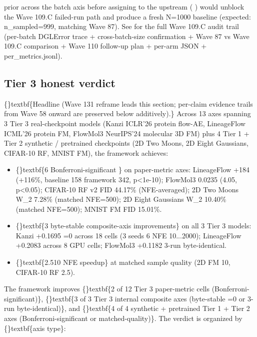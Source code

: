 \documentclass{article}
\begin{document}
prior across the batch axis before assigning to the upstream (  )  would unblock the Wave 109.C failed-run path and produce a fresh N=1000 baseline (expected: n\_sampled=999, matching Wave 87). See  for the full Wave 109.C audit trail (per-batch DGLError trace + cross-batch-size confirmation + Wave 87 vs Wave 109.C comparison + Wave 110 follow-up plan + per-arm JSON + per\_metrics.jsonl).

\subsection{Tier 3 honest verdict}
\{\}textbf\{Headline (Wave 131 reframe  leads this section; per-claim evidence trails from Wave 58 onward are preserved below additively).\} Across 13 axes spanning 3 Tier 3 real-checkpoint models (Kanzi ICLR'26 protein flow-AE, LineageFlow ICML'26 protein FM, FlowMol3 NeurIPS'24 molecular 3D FM) plus 4 Tier 1 + Tier 2 synthetic / pretrained checkpoints (2D Two Moons, 2D Eight Gaussians, CIFAR-10 RF, MNIST FM), the framework achieves:

\begin{itemize}
\item \{\}textbf\{6 Bonferroni-significant \} on paper-metric axes: LineageFlow  +184 (+116\%, baseline 158  framework 342, p<1e-10); FlowMol3  0.0235 (4.05, p<0.05); CIFAR-10 RF v2 FID 44.17\% (NFE-averaged); 2D Two Moons W\_2 7.28\% (matched NFE=500); 2D Eight Gaussians W\_2 10.40\% (matched NFE=500); MNIST FM FID 15.01\%.
\item \{\}textbf\{3 byte-stable composite-axis improvements\} on all 3 Tier 3 models: Kanzi +0.1695 =0 across 18 cells (3 seeds  6 NFE 10...2000); LineageFlow +0.2083 across 8 GPU cells; FlowMol3 +0.1182 3-run byte-identical.
\item \{\}textbf\{2.510 NFE speedup\} at matched sample quality (2D FM 10, CIFAR-10 RF 2.5).
\end{itemize}
The framework improves \{\}textbf\{2 of 12 Tier 3 paper-metric cells (Bonferroni-significant)\}, \{\}textbf\{3 of 3 Tier 3 internal composite axes (byte-stable =0 or 3-run byte-identical)\}, and \{\}textbf\{4 of 4 synthetic + pretrained Tier 1 + Tier 2 axes (Bonferroni-significant or matched-quality)\}. The verdict is organized by \{\}textbf\{axis type\}:
\end{document}
